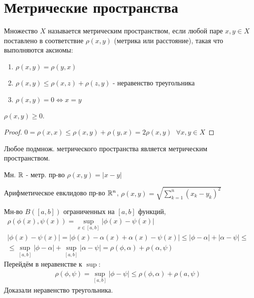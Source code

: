\documentclass{article}
\begin{document}
\section{Метрические пространства}
\begin{definition}
  Множество $X$ называется метрическим пространством,
  если любой паре $x,y\in X$ поставлено в соответствие $\rho(x,y)$ (метрика или расстояние),
  такая что выполняются аксиомы:
  \begin{enumerate}
    \item $\rho(x,y)=\rho(y,x)$
    \item $\rho(x,y) \le \rho(x,z)+\rho(z,y)$ - неравенство треугольника
    \item $\rho(x,y)=0 \iff x=y$
  \end{enumerate}
\end{definition}
\begin{property}
  $\rho(x,y) \ge 0$.
\end{property} 
\begin{proof}
  $0=\rho(x,x) \le \rho(x,y)+\rho(y,x)=2\rho(x,y) \;$ $\forall x,y\in X$
\end{proof}
\begin{remark}
  Любое подмнож. метрического пространства является метрическим пространством.
\end{remark}
\begin{eg}
  Мн. $\mathbb{R}$ - метр. пр-во $\rho(x,y)=|x-y|$
\end{eg}
\begin{eg}
  Арифметическое евклидово пр-во $\mathbb{R}^{n}$, $\rho(x,y)=\sqrt{\sum_{k=1}^{n}(x_k-y_k)^{2}}$
\end{eg}
\begin{eg}
  Мн-во $B([a,b])$ ограниченных на $[a,b]$ функций,
  \begin{gather*}
    \rho(\phi(x), \psi(x))=\sup \limits_{x\in[a,b]}|\phi(x)-\psi(x)| \\ 
    |\phi(x)-\psi(x)|=|\phi(x)-\alpha(x)+\alpha(x)-\psi(x)|
    \le |\phi - \alpha| + |\alpha - \psi| \le\\
    \le \sup \limits_{[a,b]}|\phi-\alpha| + \sup \limits_{[a,b]}|\alpha-\psi| 
    =\rho(\phi,\alpha)+\rho(\alpha,\psi)
  \end{gather*}
  Перейдём в неравенстве к $\sup$:
  \begin{gather*}
  \rho(\phi,\psi)=\sup \limits_{[a,b]}|\phi -\psi| \le \rho(\phi,\alpha)+\rho(a,\psi)
  \end{gather*}
  Доказали неравенство треугольника.
\end{eg}
\end{document}
